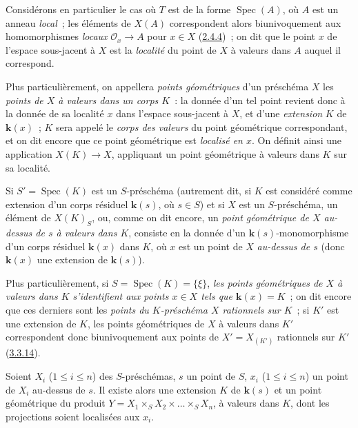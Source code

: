 \begin{env}[3.4.5]
\label{I.3.4.5-fr}
Considérons en particulier le cas où $T$ est de la forme $\operatorname{Spec}(A)$,
où $A$ est un anneau \emph{local}~; les éléments de $X(A)$ correspondent alors
biunivoquement aux homomorphismes \emph{locaux} $\mathcal{O}_x\to A$ pour
$x\in X$ (\hyperref[I.2.4.4-fr]{2.4.4})~; on dit que le point $x$ de l'espace
sous-jacent à $X$ est la \emph{localité} du point de $X$ à valeurs dans $A$
auquel il correspond.

Plus particulièrement, on appellera \emph{points géométriques} d'un préschéma
$X$ les \emph{points de $X$ à valeurs dans un corps $K$}~: la donnée d'un tel
point revient donc à la donnée de sa
localité $x$ dans l'espace sous-jacent à $X$, et d'une \emph{extension} $K$ de
$\boldsymbol{k}(x)$~; $K$ sera appelé le \emph{corps des valeurs} du point géométrique
correspondant, et on dit encore que ce point géométrique est \emph{localisé en
$x$}. On définit ainsi une application $X(K)\to X$, appliquant un point
géométrique à valeurs dans $K$ sur sa localité.

Si $S'=\operatorname{Spec}(K)$ est un $S$-préschéma (autrement dit, si $K$ est
considéré comme extension d'un corps résiduel $\boldsymbol{k}(s)$, où $s\in S$) et si $X$
est un $S$-préschéma, un élément de $X(K)_S$, ou, comme on dit encore, un
\emph{point géométrique de $X$ au-dessus de $s$ à valeurs dans $K$}, consiste
en la donnée d'un $\boldsymbol{k}(s)$-monomorphisme d'un corps résiduel $\boldsymbol{k}(x)$ dans $K$, où
$x$ est un point de $X$ \emph{au-dessus de $s$} (donc $\boldsymbol{k}(x)$ une extension de
$\boldsymbol{k}(s)$).

Plus particulièrement, si $S=\operatorname{Spec}(K)=\{\xi\}$, \emph{les points
géométriques de $X$ à valeurs dans $K$ s'identifient aux points $x\in X$ tels
que $\boldsymbol{k}(x)=K$}~; on dit encore que ces derniers sont les \emph{points du
$K$-préschéma $X$ rationnels sur $K$}~; si $K'$ est une extension de $K$, les
points géométriques de $X$ à valeurs dans $K'$ correspondent donc
biunivoquement aux points de $X'=X_{(K')}$ rationnels sur $K'$
(\hyperref[I.3.3.14-fr]{3.3.14}).
\end{env}

\begin{lemma}[3.4.6]
\label{I.3.4.6-fr}
Soient $X_i$ ($1\leq i\leq n$) des $S$-préschémas, $s$ un point de $S$, $x_i$
($1\leq i\leq n$) un point de $X_i$ au-dessus de $s$. Il existe alors une
extension $K$ de $\boldsymbol{k}(s)$ et un point géométrique du produit
$Y=X_1\times_S X_2\times\ldots\times_S X_n$, à valeurs dans $K$, dont les
projections soient localisées aux $x_i$.
\end{lemma}

